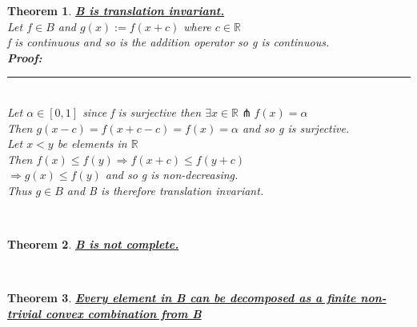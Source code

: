 \documentclass[12pt]{extarticle}
\theoremstyle{plain}
\newtheorem{thm}{Theorem}[section]
\theoremstyle{plain}
\theoremstyle{plain}
\theoremstyle{Definition}
\theoremstyle{Definition}
\theoremstyle{plain}
\theoremstyle{plain}
\newcommand{\cut}[0]{\noindent\framebox[\linewidth]{\rule{\linewidth}{2pt}}\\}
\newcommand{\prof}[0]{	\noindent \textbf{Proof:} \rule{500pt}{2pt} \\ }
\begin{document}
	\begin{thm} \underline{\textbf{B is translation invariant.}} \\
			Let $f \in B$ and $g(x) := f(x+c)$ where $c \in \mathbb{R}$ \\
			f is continuous and so is the addition operator so g is continuous. \\
			\prof
			Let $\alpha \in [0,1]$ since f is surjective then $\exists x \in \mathbb{R} \pitchfork f(x) = \alpha$ \\ 
			Then $g(x-c) = f(x+c-c) = f(x) = \alpha$ and so g is surjective. \\ 
			Let $x < y$ be elements in $\mathbb{R}$ \\
			Then $f(x) \leq f(y) \Rightarrow f(x+c) \leq f(y+c)$ \\ 
			$\Rightarrow g(x) \leq f(y)$ and so g is non-decreasing. \\ 
			Thus $g \in B$ and B is therefore translation invariant. 
	\end{thm}
	\cut
	\begin{thm} \underline{\textbf{B is not complete.}} \\
			
	\end{thm}
	\cut
	\begin{thm} \underline{\textbf{Every element in B can be decomposed as a finite non-trivial convex combination from B}} \\
	
	\end{thm}
	\cut
\end{document}

